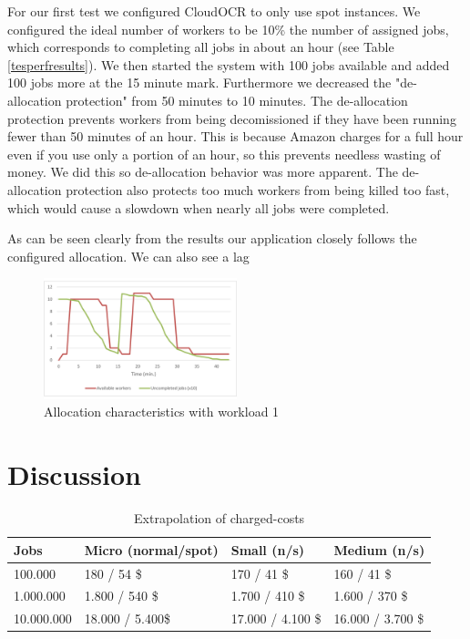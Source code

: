 \documentclass[a4paper]{IEEEtran}
\begin{document}
For our first test we configured CloudOCR to only use spot instances. We configured the ideal number of workers to be 10\% the number of assigned jobs, which corresponds to completing all jobs in about an hour (see Table \ref{tesperfresults}). We then started the system with 100 jobs available and added 100 jobs more at the 15 minute mark.
Furthermore we decreased the "de-allocation protection" from 50 minutes to 10 minutes. The de-allocation protection prevents workers from being decomissioned if they have been running fewer than 50 minutes of an hour. This is because Amazon charges for a full hour even if you use only a portion of an hour, so this prevents needless wasting of money. We did this so de-allocation behavior was more apparent. The de-allocation protection also protects too much workers from being killed too fast, which would cause a slowdown when nearly all jobs were completed.

As can be seen clearly from the results our application closely follows the configured allocation. We can also see a lag 

\begin{figure}
\centering
\includegraphics[width=0.5\textwidth]{"results-allocation-2"}
\caption{Allocation characteristics with workload 1}
\label{fig_tesperfresults}
\end{figure}
 

\section{Discussion}

	\begin{table}
	\caption{Extrapolation of charged-costs}
	\label{extpcosts}
	\centering
	\begin{tabular}{| l | l | l | l |}
	\hline
	Jobs & Micro (normal/spot) & Small (n/s) & Medium (n/s)\\ \hline
	100.000 &  180 / 54 \$ & 170 / 41 \$ &  160 / 41 \$ \\ \hline
	1.000.000 &  1.800 / 540 \$ & 1.700 / 410 \$ &  1.600 / 370 \$ \\ \hline
	10.000.000 &  18.000 / 5.400\$ & 17.000 / 4.100 \$ & 16.000 / 3.700 \$ \\ \hline
	\end{tabular}
	\end{table}	
	
\end{document}
